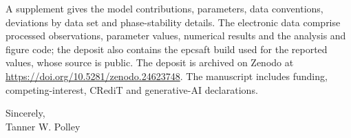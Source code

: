 \documentclass[11pt]{article}
\begin{document}
A supplement gives the model contributions, parameters, data conventions, deviations by data set and phase-stability details.
The electronic data comprise processed observations, parameter values, numerical results and the analysis and figure code; the deposit also contains the epcsaft build used for the reported values, whose source is public.
The deposit is archived on Zenodo at \url{https://doi.org/10.5281/zenodo.24623748}.
The manuscript includes funding, competing-interest, CRediT and generative-AI declarations.

Sincerely,\\[1.4\baselineskip]
Tanner W. Polley
\end{document}
